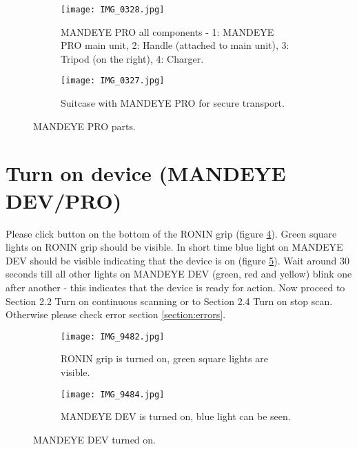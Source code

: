 \begin{figure}[H]
	\centering
	\begin{subfigure}[b]{0.7\textwidth}
		\centering
		\texttt{[image: IMG\_0328.jpg]}
		\caption{MANDEYE PRO all components - 1: MANDEYE PRO main unit, 2: Handle (attached to main unit), 3: Tripod (on the right), 4: Charger.}
		\label{fig:m11b}
	\end{subfigure}
	\hfill
	\begin{subfigure}[b]{0.7\textwidth}
		\centering
		\texttt{[image: IMG\_0327.jpg]}
		\caption{Suitcase with MANDEYE PRO for secure transport.}
		\label{fig:m12b}
	\end{subfigure}
	\caption{MANDEYE PRO parts.}
	\label{fig:mandeye_hardwareb}
\end{figure}

\section{Turn on device (MANDEYE DEV/PRO)}
Please click button on the bottom of the RONIN grip (figure \ref{fig:m21}). 
Green square lights on RONIN grip should be visible. In short time blue light on MANDEYE DEV should be visible indicating that the device is on (figure \ref{fig:m22}). Wait around 30 seconds till all other lights on MANDEYE DEV (green, red and yellow) blink one after another - this indicates that the device is ready for action. Now proceed to Section 2.2 Turn on continuous scanning or to Section 2.4 Turn on stop scan.
Otherwise please check error section \ref{section:errors}.
\begin{figure}[H]
	\centering
	\begin{subfigure}[b]{0.45\textwidth}
		\centering
		\texttt{[image: IMG\_9482.jpg]}
		\caption{RONIN grip is turned on, green square lights are visible.}
		\label{fig:m21}
	\end{subfigure}
	\hfill
	\begin{subfigure}[b]{0.45\textwidth}
		\centering
		\texttt{[image: IMG\_9484.jpg]}
		\caption{MANDEYE DEV is turned on, blue light can be seen.}
		\label{fig:m22}
	\end{subfigure}
	\caption{MANDEYE DEV turned on.}
	\label{fig:mandeye_hardware2}
\end{figure}
